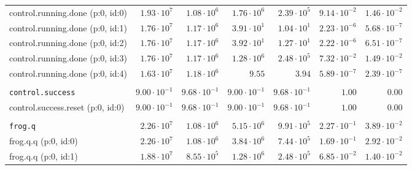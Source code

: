 \begin{table}[htbp]
{\begin{tabular}{lrrrrrr}
\hspace{3mm}control.running.done (p:0, id:0)  &  $1.93 \cdot 10^{7}$ &  $1.08 \cdot 10^{6}$ &  $1.76 \cdot 10^{6}$ &  $2.39 \cdot 10^{5}$ & $9.14 \cdot 10^{-2}$ & $1.46 \cdot 10^{-2}$ \\
\hspace{3mm}control.running.done (p:0, id:1)  &  $1.76 \cdot 10^{7}$ &  $1.17 \cdot 10^{6}$ &  $3.91 \cdot 10^{1}$ &  $1.04 \cdot 10^{1}$ & $2.23 \cdot 10^{-6}$ & $5.68 \cdot 10^{-7}$ \\
\hspace{3mm}control.running.done (p:0, id:2)  &  $1.76 \cdot 10^{7}$ &  $1.17 \cdot 10^{6}$ &  $3.92 \cdot 10^{1}$ &  $1.27 \cdot 10^{1}$ & $2.22 \cdot 10^{-6}$ & $6.51 \cdot 10^{-7}$ \\
\hspace{3mm}control.running.done (p:0, id:3)  &  $1.76 \cdot 10^{7}$ &  $1.17 \cdot 10^{6}$ &  $1.28 \cdot 10^{6}$ &  $2.48 \cdot 10^{5}$ & $7.32 \cdot 10^{-2}$ & $1.49 \cdot 10^{-2}$ \\
\hspace{3mm}control.running.done (p:0, id:4)  &  $1.63 \cdot 10^{7}$ &  $1.18 \cdot 10^{6}$ &               $9.55$ &               $3.94$ & $5.89 \cdot 10^{-7}$ & $2.39 \cdot 10^{-7}$ \\
\\[-8pt]\texttt{control.success}              & $9.00 \cdot 10^{-1}$ & $9.68 \cdot 10^{-1}$ & $9.00 \cdot 10^{-1}$ & $9.68 \cdot 10^{-1}$ &               $1.00$ &               $0.00$ \\
\hspace{3mm}control.success.reset (p:0, id:0) & $9.00 \cdot 10^{-1}$ & $9.68 \cdot 10^{-1}$ & $9.00 \cdot 10^{-1}$ & $9.68 \cdot 10^{-1}$ &               $1.00$ &               $0.00$ \\
\\[-8pt]\texttt{frog.q}                       &  $2.26 \cdot 10^{7}$ &  $1.08 \cdot 10^{6}$ &  $5.15 \cdot 10^{6}$ &  $9.91 \cdot 10^{5}$ & $2.27 \cdot 10^{-1}$ & $3.89 \cdot 10^{-2}$ \\
\hspace{3mm}frog.q.q (p:0, id:0)              &  $2.26 \cdot 10^{7}$ &  $1.08 \cdot 10^{6}$ &  $3.84 \cdot 10^{6}$ &  $7.44 \cdot 10^{5}$ & $1.69 \cdot 10^{-1}$ & $2.92 \cdot 10^{-2}$ \\
\hspace{3mm}frog.q.q (p:0, id:1)              &  $1.88 \cdot 10^{7}$ &  $8.55 \cdot 10^{5}$ &  $1.28 \cdot 10^{6}$ &  $2.48 \cdot 10^{5}$ & $6.85 \cdot 10^{-2}$ & $1.40 \cdot 10^{-2}$ \\

\end{tabular}}
\end{table}
